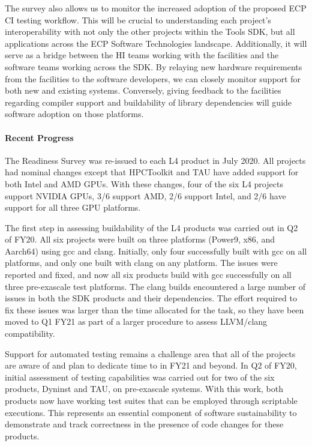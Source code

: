 The survey also allows us to monitor the increased adoption of the proposed ECP CI testing workflow. This will be crucial to understanding each project’s interoperability with not only the other projects within the Tools SDK, but all applications across the ECP Software Technologies landscape. Additionally, it will serve as a bridge between the HI teams working with the facilities and the software teams working across the SDK. By relaying new hardware requirements from the facilities to the software developers, we can closely monitor support for both new and existing systems. Conversely, giving feedback to the facilities regarding compiler support and buildability of library dependencies will guide software adoption on those platforms.

\paragraph{Recent Progress}
The Readiness Survey was re-issued to each L4 product in July 2020. All projects had nominal changes except that HPCToolkit and TAU have added support for both Intel and AMD GPUs. With these changes,  four of the six L4 projects support NVIDIA GPUs, 3/6 support AMD, 2/6 support Intel, and 2/6 have support for all three GPU platforms.

The first step in assessing buildability of the L4 products was carried out in Q2 of FY20. All six projects were built on three platforms (Power9, x86, and Aarch64) using gcc and clang. Initially, only four successfully built with gcc on all platforms, and only one built with clang on any platform. The issues were reported and fixed, and now all six products build with gcc successfully on all three pre-exascale test platforms. The clang builds encountered a large number of issues in both the SDK products and their dependencies. The effort required to fix these issues was larger than the time allocated for the task, so they have been moved to Q1 FY21 as part of a larger procedure to assess LLVM/clang compatibility.

Support for automated testing remains a challenge area that all of the projects are aware of and plan to dedicate time to in FY21 and beyond. In Q2 of FY20, initial assessment of testing capabilities was carried out for two of the six products, Dyninst and TAU, on pre-exascale systems. With this work, both products now have working test suites that can be employed through scriptable executions. This represents an essential component of software sustainability to demonstrate and track correctness in the presence of code changes for these products.

